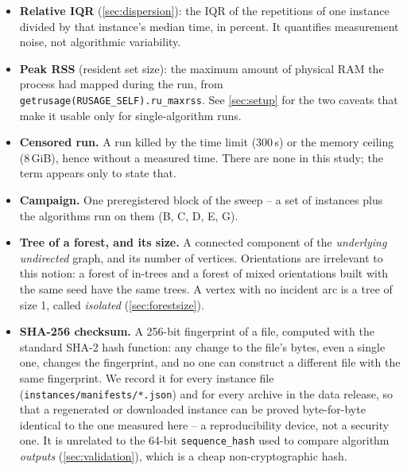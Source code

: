 \documentclass[11pt]{article}
\begin{document}
\begin{itemize}
  containing the central half of the observations. It is to the median what the
  standard deviation is to the mean, but insensitive to the tails. Beside a
  median ratio, a large IQR signals that the population mixes regimes instead
  of scattering around one value -- exactly what happens across densities in
  \cref{sec:ccamp}.
  \item \textbf{Relative IQR} (\cref{sec:dispersion}): the IQR of the
  repetitions of one instance divided by that instance's median time, in
  percent. It quantifies measurement noise, not algorithmic variability.
  \item \textbf{Peak RSS} (resident set size): the maximum amount of physical
  RAM the process had mapped during the run, from
  \texttt{getrusage(RUSAGE\_SELF).ru\_maxrss}. See \cref{sec:setup} for the
  two caveats that make it usable only for single-algorithm runs.
  \item \textbf{Censored run.} A run killed by the time limit (300\,s) or the
  memory ceiling (8\,GiB), hence without a measured time. There are none in
  this study; the term appears only to state that.
  \item \textbf{Campaign.} One preregistered block of the sweep -- a set of
  instances plus the algorithms run on them (B, C, D, E, G).
  \item \textbf{Tree of a forest, and its size.} A connected component of the
  \emph{underlying undirected} graph, and its number of vertices. Orientations
  are irrelevant to this notion: a forest of in-trees and a forest of mixed
  orientations built with the same seed have the same trees. A vertex with no
  incident arc is a tree of size 1, called \emph{isolated}
  (\cref{sec:forestsize}).
  \item \textbf{SHA-256 checksum.} A 256-bit fingerprint of a file, computed
  with the standard SHA-2 hash function: any change to the file's bytes, even a
  single one, changes the fingerprint, and no one can construct a different
  file with the same fingerprint. We record it for every instance file
  (\texttt{instances/manifests/*.json}) and for every archive in the data
  release, so that a regenerated or downloaded instance can be proved
  byte-for-byte identical to the one measured here -- a reproducibility device,
  not a security one. It is unrelated to the 64-bit \texttt{sequence\_hash}
  used to compare algorithm \emph{outputs} (\cref{sec:validation}), which is a
  cheap non-cryptographic hash.
\end{itemize}
\end{document}
